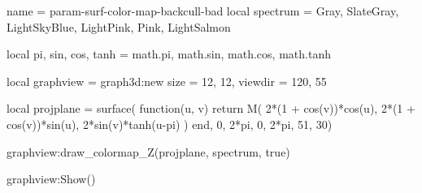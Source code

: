 \documentclass{standalone}
\begin{document}
\begin{luadraw}{name = param-surf-color-map-backcull-bad}
local spectrum = {Gray, SlateGray, LightSkyBlue, LightPink, Pink, LightSalmon}

local pi, sin, cos, tanh = math.pi, math.sin, math.cos, math.tanh

local graphview = graph3d:new{
  size    = {12, 12},
  viewdir = {120, 55}
}

local projplane = surface(
  function(u, v)
    return M(
      2*(1 + cos(v))*cos(u),
      2*(1 + cos(v))*sin(u),
      2*sin(v)*tanh(u-pi)
    )
  end,
  0, 2*pi, 0,  2*pi,
  {51, 30})

graphview:draw_colormap_Z(projplane, spectrum, true)

graphview:Show()
\end{luadraw}
\end{document}
